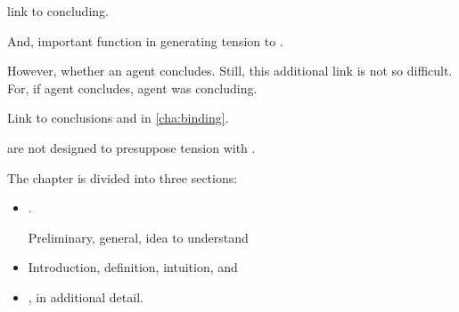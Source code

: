 \begin{note}
   link  to concluding.

  And, important function in generating tension to \issueConstraint{}.

  However, whether an agent concludes.
  Still, this additional link is not so difficult.
  For, if agent concludes, agent was concluding.

  Link  to conclusions and \issueConstraint{} in \autoref{cha:binding}.

   are not designed to presuppose tension with \issueConstraint{}.
\end{note}

\begin{note}
  The chapter is divided into three sections:
  \begin{itemize}
  \item

    \ninf{}.

    Preliminary, general, idea to understand 
  \item

    Introduction, definition, intuition, and 
  \item

    , in additional detail.
  \end{itemize}
\end{note}

\section{}
\label{cha:requs:sec:infl}

